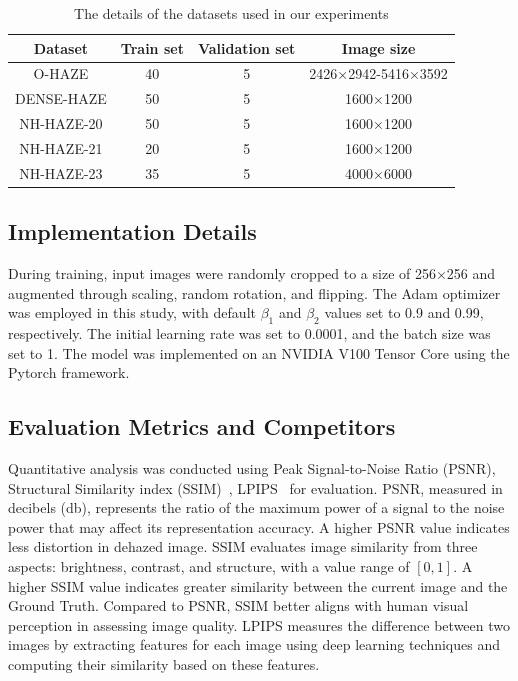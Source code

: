 \documentclass[journal]{IEEEtran}
\begin{document}
\begin{table}
	\begin{center}
		\caption{The details of the datasets used in our experiments}
		\label{table_dataset}
		\begin{tabular}{ c | c | c | c }
			\hline
			Dataset    & Train set & Validation set & Image size          \\
			\hline
			O-HAZE     & 40        & 5              & 2426×2942-5416×3592 \\
			DENSE-HAZE & 50        & 5              & 1600×1200           \\
			NH-HAZE-20 & 50        & 5              & 1600×1200           \\
			NH-HAZE-21 & 20        & 5              & 1600×1200           \\
			NH-HAZE-23 & 35        & 5              & 4000×6000           \\
			\hline
		\end{tabular}
	\end{center}
\end{table}

\subsection{Implementation Details}
During training, input images were randomly cropped to a size of 256×256 and augmented through scaling, random rotation, and flipping. The Adam optimizer~\cite{kingma2014adam} was employed in this study, with default $\beta_{1}$ and $\beta_{2}$ values set to 0.9 and 0.99, respectively. The initial learning rate was set to 0.0001, and the batch size was set to 1. The model was implemented on an NVIDIA V100 Tensor Core using the Pytorch framework.

\subsection{Evaluation Metrics and Competitors}
Quantitative analysis was conducted using Peak Signal-to-Noise Ratio (PSNR), Structural Similarity index (SSIM)~\cite{wang2004image}, LPIPS~\cite{zhang2018unreasonable} for evaluation. PSNR, measured in decibels (db), represents the ratio of the maximum power of a signal to the noise power that may affect its representation accuracy. A higher PSNR value indicates less distortion in dehazed image. SSIM evaluates image similarity from three aspects: brightness, contrast, and structure, with a value range of $[0,1]$. A higher SSIM value indicates greater similarity between the current image and the Ground Truth. Compared to PSNR, SSIM better aligns with human visual perception in assessing image quality. LPIPS measures the difference between two images by extracting features for each image using deep learning techniques and computing their similarity based on these features.
\end{document}
